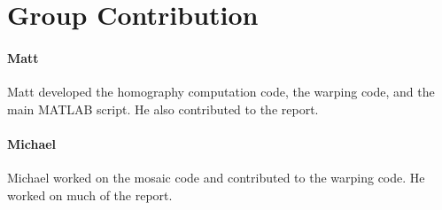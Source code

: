 \documentclass[11pt, letterpaper]{article}
\begin{document}

\section{Group Contribution}
\paragraph{Matt}
Matt developed the homography computation code, the warping code, and
the main MATLAB script. He also contributed to the report.

\paragraph{Michael}
Michael worked on the mosaic code and contributed to the warping
code. He worked on much of the report.
\end{document}
